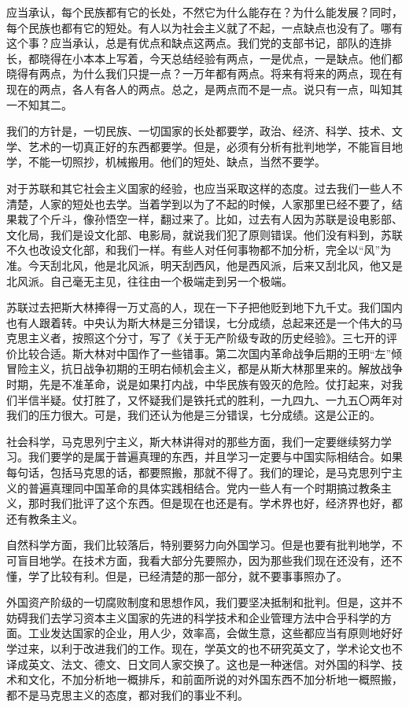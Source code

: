 应当承认，每个民族都有它的长处，不然它为什么能存在？为什么能发展？同时，每个民族也都有它的短处。有人以为社会主义就了不起，一点缺点也没有了。哪有这个事？应当承认，总是有优点和缺点这两点。我们党的支部书记，部队的连排长，都晓得在小本本上写着，今天总结经验有两点，一是优点，一是缺点。他们都晓得有两点，为什么我们只提一点？一万年都有两点。将来有将来的两点，现在有现在的两点，各人有各人的两点。总之，是两点而不是一点。说只有一点，叫知其一不知其二。

我们的方针是，一切民族、一切国家的长处都要学，政治、经济、科学、技术、文学、艺术的一切真正好的东西都要学。但是，必须有分析有批判地学，不能盲目地学，不能一切照抄，机械搬用。他们的短处、缺点，当然不要学。

对于苏联和其它社会主义国家的经验，也应当采取这样的态度。过去我们一些人不清楚，人家的短处也去学。当着学到以为了不起的时候，人家那里已经不要了，结果栽了个斤斗，像孙悟空一样，翻过来了。比如，过去有人因为苏联是设电影部、文化局，我们是设文化部、电影局，就说我们犯了原则错误。他们没有料到，苏联不久也改设文化部，和我们一样。有些人对任何事物都不加分析，完全以“风”为准。今天刮北风，他是北风派，明天刮西风，他是西风派，后来又刮北风，他又是北风派。自己毫无主见，往往由一个极端走到另一个极端。

苏联过去把斯大林捧得一万丈高的人，现在一下子把他贬到地下九千丈。我们国内也有人跟着转。中央认为斯大林是三分错误，七分成绩，总起来还是一个伟大的马克思主义者，按照这个分寸，写了《关于无产阶级专政的历史经验》。三七开的评价比较合适。斯大林对中国作了一些错事。第二次国内革命战争后期的王明“左”倾冒险主义，抗日战争初期的王明右倾机会主义，都是从斯大林那里来的。解放战争时期，先是不准革命，说是如果打内战，中华民族有毁灭的危险。仗打起来，对我们半信半疑。仗打胜了，又怀疑我们是铁托式的胜利，一九四九、一九五〇两年对我们的压力很大。可是，我们还认为他是三分错误，七分成绩。这是公正的。

社会科学，马克思列宁主义，斯大林讲得对的那些方面，我们一定要继续努力学习。我们要学的是属于普遍真理的东西，并且学习一定要与中国实际相结合。如果每句话，包括马克思的话，都要照搬，那就不得了。我们的理论，是马克思列宁主义的普遍真理同中国革命的具体实践相结合。党内一些人有一个时期搞过教条主义，那时我们批评了这个东西。但是现在也还是有。学术界也好，经济界也好，都还有教条主义。

自然科学方面，我们比较落后，特别要努力向外国学习。但是也要有批判地学，不可盲目地学。在技术方面，我看大部分先要照办，因为那些我们现在还没有，还不懂，学了比较有利。但是，已经清楚的那一部分，就不要事事照办了。

外国资产阶级的一切腐败制度和思想作风，我们要坚决抵制和批判。但是，这并不妨碍我们去学习资本主义国家的先进的科学技术和企业管理方法中合乎科学的方面。工业发达国家的企业，用人少，效率高，会做生意，这些都应当有原则地好好学过来，以利于改进我们的工作。现在，学英文的也不研究英文了，学术论文也不译成英文、法文、德文、日文同人家交换了。这也是一种迷信。对外国的科学、技术和文化，不加分析地一概排斥，和前面所说的对外国东西不加分析地一概照搬，都不是马克思主义的态度，都对我们的事业不利。


